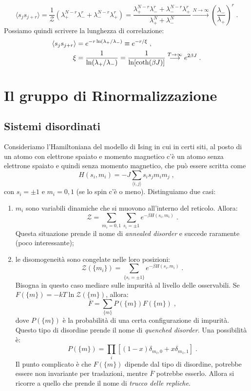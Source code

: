 \documentclass[10pt,a4paper]{report}
\theoremstyle{definition}
\numberwithin{equation}{section}
\newcommand{\bra}{\langle}
\newcommand{\ket}{\rangle}
\newcommand{\zpart}{\mathcal{Z}}
\begin{document}
\begin{equation}
\bra s_js_{j+r}\ket =\frac{1}{\zpart}(\lambda_+^{N-r}\lambda_-^r+\lambda_-^{N-r}\lambda_+^r)=\frac{\lambda_+^{N-r}\lambda_-^r+\lambda_-^{N-r}\lambda_+^r}{\lambda_+^N+\lambda_-^N}\stackrel{N\to\infty}{\longrightarrow}\left(\frac{\lambda_-}{\lambda_+}\right)^r\;.
\end{equation}
Possiamo quindi scrivere la lunghezza di correlazione:
\begin{align}
\bra s_js_{j+r}\ket &=e^{-r\ln(\lambda_+/\lambda_-)}\equiv e^{-r/\xi}\;, \notag \\
\xi &= \frac{1}{\ln(\lambda_+/\lambda_-)}=\frac{1}{\ln[\coth(\beta J)]}\stackrel{T\to\infty}{\longrightarrow} e^{2\beta J}\;.
\end{align}
\chapter{Il gruppo di Rinormalizzazione}
\section{Sistemi disordinati}
Consideriamo l'Hamiltoniana del modello di Ising in cui in certi siti, al posto di un atomo con elettrone spaiato e momento magnetico c'è un atomo senza elettrone spaiato e quindi senza momento magnetico, che può essere scritta come
\begin{equation}
H(s_i,m_i)=-J\sum_{\bra i,j\ket}s_is_jm_im_j\;,
\end{equation}
con $s_i=\pm 1$ e $m_i=0,1$ (se lo spin c'è o meno). Distinguiamo due casi:
\begin{enumerate}
\item $m_i$ sono variabili dinamiche che si muovono all'interno del reticolo. Allora:
\begin{equation}
\zpart=\sum_{m_i=0,1}\sum_{s_i=\pm 1}e^{-\beta H(s_i,m_i)}\;.
\end{equation}
Questa situazione prende il nome di \emph{annealed disorder} e succede raramente (poco interessante);
\item le disomogeneità sono congelate nelle loro posizioni:
\begin{equation}
\zpart(\{m_i\})=\sum_{\{s_i=\pm 1\}}e^{-\beta H(s_i,m_i)}\;.
\end{equation}
Bisogna in questo caso mediare sulle impurità al livello delle osservabili. Se $F(\{m\})=-kT\ln\zpart(\{m\})$, allora:
\begin{equation}
\overline{F}=\sum_{\{m\}}P(\{m\})F(\{m\})\;,
\end{equation}
dove $P(\{m\})$ è la probabilità di una certa configurazione di impurità. Questo tipo di disordine prende il nome di \emph{quenched disorder}. Una possibilità è:
\begin{equation}
P(\{m\})=\prod_i[(1-x)\delta_{m_i,0}+x\delta_{m_1,1}]\;.
\end{equation}
Il punto complicato è che  $F(\{m\})$ dipende dal tipo di disordine, potrebbe essere non invariante per traslazioni, mentre $\overline{F}$ potrebbe esserlo. Allora si ricorre a quello che prende il nome di \emph{trucco delle repliche}.
\end{enumerate}
\end{document}
